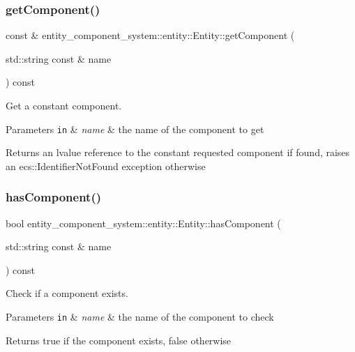 \subsubsection{get\+Component()\hspace{0.1cm}{\footnotesize\ttfamily [2/2]}}
{\footnotesize{} const  \& entity\+\_\+component\+\_\+system\+::entity\+::\+Entity\+::get\+Component (\begin{DoxyParamCaption}\item[{std\+::string const \&}]{name }\end{DoxyParamCaption}) const}



Get a constant component. 


\begin{DoxyParams}[1]{Parameters}
\mbox{\tt in}  & {\em name} & the name of the component to get \\
\hline
\end{DoxyParams}
\begin{DoxyReturn}{Returns}
an lvalue reference to the constant requested component if found, raises an ecs\+::\+Identifier\+Not\+Found exception otherwise 
\end{DoxyReturn}
\label{classentity__component__system_1_1entity_1_1_entity_abc71d22109dd5ba9b6c6825299404cc0} 
\subsubsection{has\+Component()}
{\footnotesize\ttfamily bool entity\+\_\+component\+\_\+system\+::entity\+::\+Entity\+::has\+Component (\begin{DoxyParamCaption}\item[{std\+::string const \&}]{name }\end{DoxyParamCaption}) const}



Check if a component exists. 


\begin{DoxyParams}[1]{Parameters}
\mbox{\tt in}  & {\em name} & the name of the component to check \\
\hline
\end{DoxyParams}
\begin{DoxyReturn}{Returns}
true if the component exists, false otherwise 
\end{DoxyReturn}
\label{classentity__component__system_1_1entity_1_1_entity_a263fa4d4733a1fd8d8b46d2f556b6e2f} 
